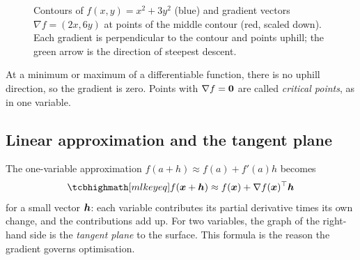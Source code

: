 \begin{figure}[htbp]
\centering
{}
\caption{Contours of $f(x, y) = x^2 + 3y^2$ (blue) and gradient vectors
  $\nabla f = (2x, 6y)$ at points of the middle contour (red, scaled down). Each
  gradient is perpendicular to the contour and points uphill; the green arrow
  is the direction of steepest descent.}
\label{fig:gradient-field}
\end{figure}

At a minimum or maximum of a differentiable function, there is no uphill
direction, so the gradient is zero. Points with $\nabla f = \bm{0}$ are called
\emph{critical points}, as in one variable.

\subsection{Linear approximation and the tangent plane}

The one-variable approximation $f(a + h) \approx f(a) + f'(a)h$ becomes
\[
  \keyeq{f(\vx + \vh) \approx f(\vx) + \nabla f(\vx)^\top\vh}
\]
for a small vector $\bm{h}$: each variable contributes its partial derivative
times its own change, and the contributions add up. For two variables, the graph
of the right-hand side is the \emph{tangent plane} to the surface. This formula
is the reason the gradient governs optimisation.

